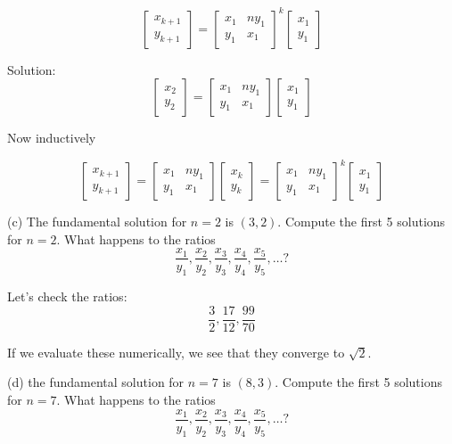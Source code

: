 \documentclass[16 pt]{amsart}
\theoremstyle{definition}
\theoremstyle{remark}
\numberwithin{equation}{subsection}
\begin{document}
\[
\begin{bmatrix}
x_{k+1}\\ y_{k+1}
\end{bmatrix} = 
\begin{bmatrix}
x_1 & ny_1\\
y_1 & x_1
\end{bmatrix}^k
\begin{bmatrix}
x_1 \\ y_1
\end{bmatrix}
\]


Solution:
\[
\begin{bmatrix}
x_2 \\ y_2
\end{bmatrix}
= 
\begin{bmatrix}
x_1 & ny_1 \\
y_1 & x_1
\end{bmatrix}
\begin{bmatrix}
x_1 \\y_1
\end{bmatrix}
\]

Now inductively

\[
\begin{bmatrix}
x_{k+1} \\ y_{k+1}
\end{bmatrix}
= 
\begin{bmatrix}
x_1 & ny_1 \\
y_1 & x_1
\end{bmatrix}
\begin{bmatrix}
x_k \\y_k
\end{bmatrix}
= 
\begin{bmatrix}
x_1 & ny_1\\
y_1 & x_1
\end{bmatrix}^k
\begin{bmatrix}
x_1 \\y_1
\end{bmatrix}
\]

(c) The fundamental solution for $n=2$ is $(3,2)$.  Compute the first 5 solutions for $n=2$.  What happens to the ratios
\[
\frac{x_1}{y_1},\frac{x_2}{y_2},\frac{x_3}{y_3},\frac{x_4}{y_4},\frac{x_5}{y_5},\dots?
\]

Let's check the ratios:
\[
\frac{3}{2},\frac{17}{12},\frac{99}{70}
\]

If we evaluate these numerically, we see that they converge to $\sqrt{2}$.

(d) the fundamental solution for $n=7$ is $(8,3)$.  Compute the first 5 solutions for $n=7$.  What happens to the ratios
\[
\frac{x_1}{y_1},\frac{x_2}{y_2},\frac{x_3}{y_3},\frac{x_4}{y_4},\frac{x_5}{y_5},\dots?
\]
\end{document}
